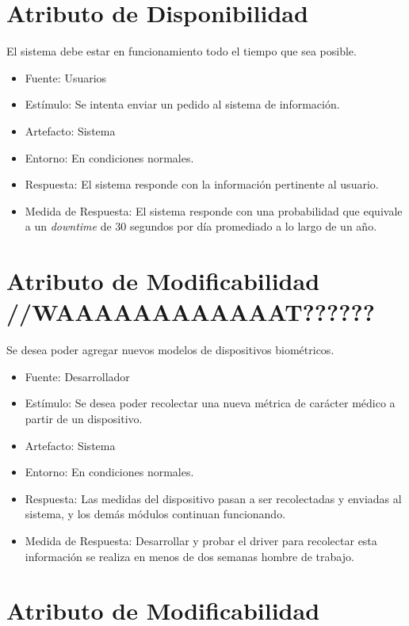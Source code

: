 \section{Atributo de Disponibilidad}

El sistema debe estar en funcionamiento todo el tiempo que sea posible.

\begin{itemize}
\itemsep1pt\parskip0pt
\item
  Fuente: Usuarios
\item
  Estímulo: Se intenta enviar un pedido al sistema de información.
\item
  Artefacto: Sistema
\item
  Entorno: En condiciones normales.
\item
  Respuesta: El sistema responde con la información pertinente al
  usuario.
\item
  Medida de Respuesta: El sistema responde con una probabilidad que
  equivale a un \emph{downtime} de 30 segundos por día promediado a lo
  largo de un año.
\end{itemize}

\section{Atributo de Modificabilidad //WAAAAAAAAAAAAT??????}

Se desea poder agregar nuevos modelos de dispositivos biométricos.

\begin{itemize}
\itemsep1pt\parskip0pt
\item
  Fuente: Desarrollador
\item
  Estímulo: Se desea poder recolectar una nueva métrica de carácter
  médico a partir de un dispositivo.
\item
  Artefacto: Sistema
\item
  Entorno: En condiciones normales.
\item
  Respuesta: Las medidas del dispositivo pasan a ser recolectadas y
  enviadas al sistema, y los demás módulos continuan funcionando.
\item
  Medida de Respuesta: Desarrollar y probar el driver para recolectar
  esta información se realiza en menos de dos semanas hombre de trabajo.
\end{itemize}

\section{Atributo de Modificabilidad}

